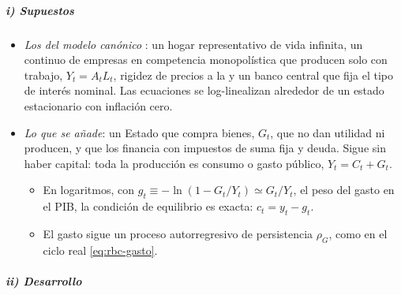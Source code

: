 \documentclass[11pt]{article}
\begin{document}
\subparagraph{i) Supuestos}

\begin{itemize}
\item \emph{Los del modelo canónico} : un hogar representativo de vida infinita, un continuo de empresas en competencia monopolística que producen solo con trabajo, $Y_t=A_tL_t$, rigidez de precios a la  y un banco central que fija el tipo de interés nominal. Las ecuaciones se log-linealizan alrededor de un estado estacionario con inflación cero.
\item \emph{Lo que se añade}: un Estado que compra bienes, $G_t$, que no dan utilidad ni producen, y que los financia con impuestos de suma fija y deuda. Sigue sin haber capital: toda la producción es consumo o gasto público, $Y_t=C_t+G_t$.
  \begin{itemize}
  \item En logaritmos, con $g_t\equiv-\ln(1-G_t/Y_t)\simeq G_t/Y_t$, el peso del gasto en el PIB, la condición de equilibrio es exacta: $c_t=y_t-g_t$.
  \item El gasto sigue un proceso autorregresivo de persistencia $\rho_G$, como en el ciclo real \eqref{eq:rbc-gasto}.
  \end{itemize}
\end{itemize}

\subparagraph{ii) Desarrollo}
\end{document}
